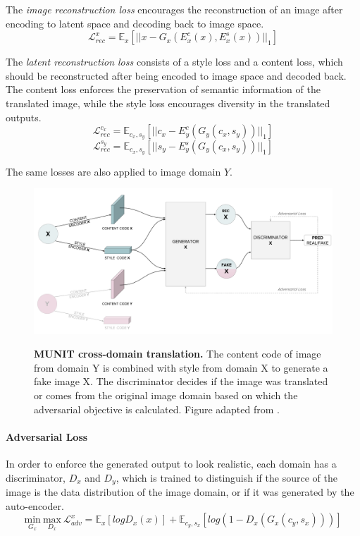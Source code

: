 \documentclass[12pt]{report}
\begin{document}
The \textit{image reconstruction loss} encourages the reconstruction of an image after encoding to latent space and decoding back to image space.
\begin{equation}
\mathcal{L}^{x}_{rec} = \mathbb{E}_{x}[||x - G_{x}(E^{c}_{x}(x), E^{s}_{x}(x))||_{1}]
\end{equation}

The \textit{latent reconstruction loss} consists of a style loss and a content loss, which should be reconstructed after being encoded to image space and decoded back. The content loss enforces the preservation of semantic information of the translated image, while the style loss encourages diversity in the translated outputs.
\begin{equation}
\mathcal{L}^{c_{x}}_{rec} = \mathbb{E}_{c_{x}, s_{y}}[||c_{x} - E^{c}_{y}(G_{y}(c_{x},s_{y}))||_{1}]
\end{equation}
\begin{equation}
\mathcal{L}^{s_{y}}_{rec} = \mathbb{E}_{c_{x}, s_{y}}[||s_{y} - E^{s}_{y}(G_{y}(c_{x},s_{y}))||_{1}]
\end{equation}

The same losses are also applied to image domain $Y$.

\begin{figure}[h]
\centering
{\includegraphics[width=\linewidth]{03_analysis/gans/munit_adv}}
\caption{\label{fig:munit_adv} \textbf{MUNIT cross-domain translation.} The content code of image from domain Y is combined with style from domain X to generate a fake image X. The discriminator decides if the image was translated or comes from the original image domain based on which the adversarial objective is calculated. Figure adapted from \cite{huang_multimodal_2018}.}
\end{figure}

\paragraph{Adversarial Loss}
In order to enforce the generated output to look realistic, each domain has a discriminator, $D_x$ and $D_y$, which is trained to distinguish if the source of the image is the data distribution of the image domain, or if it was generated by the auto-encoder.
\begin{equation}
\underset{G_x}{\mathrm{min}} \ \underset{D_x}{\mathrm{max}} \ \mathcal{L}^{x}_{adv} = \mathbb{E}_{x}[logD_{x}(x)] + \mathbb{E}_{c_{y}, s_{x}}[log(1 - D_{x}(G_{x}(c_{y}, s_{x})))]
\end{equation}
\end{document}

